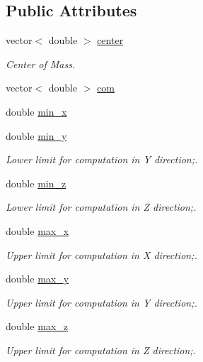 \subsection*{Public Attributes}
\begin{DoxyCompactItemize}
\item 
vector$<$ double $>$ \hyperlink{classGrid_a9a5662b9d7dafec37fe08f5851f7926c}{center}
\begin{DoxyCompactList}\small\item\em Center of Mass. \end{DoxyCompactList}\item 
vector$<$ double $>$ \hyperlink{classGrid_a46c4f059aba71bdb9b3eecac4b7275a8}{com}
\item 
double \hyperlink{classGrid_a16930d1358fd0b70fc84031dbd1b6149}{min\_\-x}
\item 
double \hyperlink{classGrid_ac5c22ae5c418071029cd7b4613704be3}{min\_\-y}
\begin{DoxyCompactList}\small\item\em Lower limit for computation in Y direction;. \end{DoxyCompactList}\item 
double \hyperlink{classGrid_a492df49b72c09feb4e9c5ab2e28ece24}{min\_\-z}
\begin{DoxyCompactList}\small\item\em Lower limit for computation in Z direction;. \end{DoxyCompactList}\item 
double \hyperlink{classGrid_a72ca32ea381e695f8705fcd3ff248523}{max\_\-x}
\begin{DoxyCompactList}\small\item\em Upper limit for computation in X direction;. \end{DoxyCompactList}\item 
double \hyperlink{classGrid_a8f3f3adf7d9a7bfe12f842603fd78787}{max\_\-y}
\begin{DoxyCompactList}\small\item\em Upper limit for computation in Y direction;. \end{DoxyCompactList}\item 
double \hyperlink{classGrid_a4c93a619b7ef2501f1eb16cb0efc4a09}{max\_\-z}
\begin{DoxyCompactList}\small\item\em Upper limit for computation in Z direction;. \end{DoxyCompactList}\item 

\end{DoxyCompactItemize}
